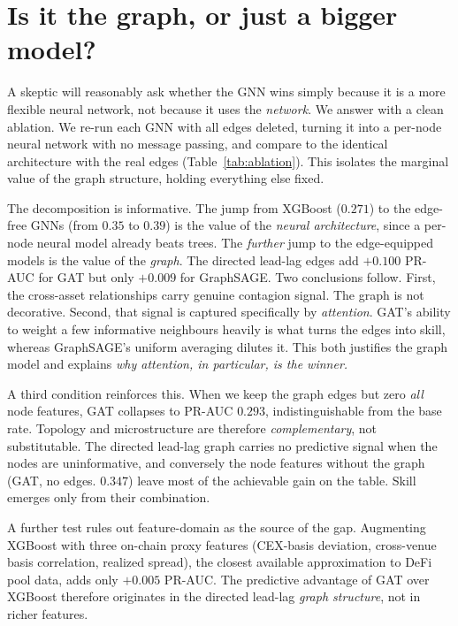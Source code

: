 \documentclass[sigconf,anonymous]{acmart}
\begin{document}
\section{Is it the graph, or just a bigger model?}\label{sec:ablation}
A skeptic will reasonably ask whether the GNN wins simply because it is a more flexible neural
network, not because it uses the \emph{network}. We answer with a clean ablation. We re-run each
GNN with all edges deleted, turning it into a per-node neural network with no message passing, and
compare to the identical architecture with the real edges (Table~\ref{tab:ablation}). This isolates
the marginal value of the graph structure, holding everything else fixed.

The decomposition is informative. The jump from XGBoost ($0.271$) to the edge-free GNNs
(from $0.35$ to $0.39$) is the value of the \emph{neural architecture}, since a per-node neural model
already beats trees. The \emph{further} jump to the edge-equipped models is the value of the \emph{graph}. The directed lead-lag edges add $\mathbf{+0.100}$ PR-AUC for GAT but only $+0.009$ for GraphSAGE.
Two conclusions follow. First, the cross-asset relationships carry genuine contagion signal. The
graph is not decorative. Second, that signal is captured specifically by \emph{attention}. GAT's
ability to weight a few informative neighbours heavily is what turns the edges into skill, whereas
GraphSAGE's uniform averaging dilutes it. This both justifies the graph model and explains
\emph{why attention, in particular, is the winner.}

A third condition reinforces this. When we keep the graph edges but zero \emph{all} node features,
GAT collapses to PR-AUC $0.293$, indistinguishable from the base rate. Topology and microstructure
are therefore \emph{complementary}, not substitutable. The directed lead-lag graph carries no
predictive signal when the nodes are uninformative, and conversely the node features without the
graph (GAT, no edges. $0.347$) leave most of the achievable gain on the table. Skill emerges only
from their combination.

A further test rules out feature-domain as the source of the gap.
Augmenting XGBoost with three on-chain proxy features (CEX-basis deviation,
cross-venue basis correlation, realized spread), the closest available
approximation to DeFi pool data, adds only $\mathbf{+0.005}$ PR-AUC. The
predictive advantage of GAT over XGBoost therefore originates in the directed
lead-lag \emph{graph structure}, not in richer features.
\end{document}
